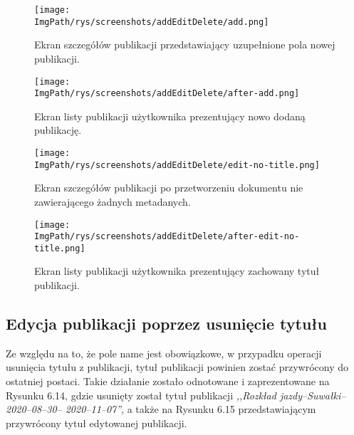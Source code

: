 \documentclass[a4paper,12pt,twoside,openany]{report}
\newcommand{\ImgPath}{.}
\begin{document}
\begin{figure}[!htbp]
	\begin{center}
		\centering
		\texttt{[image: \\ImgPath/rys/screenshots/addEditDelete/add.png]}
	\end{center}
	\caption{Ekran szczegółów publikacji przedstawiający uzupełnione pola nowej publikacji.}
	\label{zrzutSzczegolyPubPrzedDodaniem}
\end{figure}

\begin{figure}[!htbp]
	\begin{center}
		\centering
		\texttt{[image: \\ImgPath/rys/screenshots/addEditDelete/after-add.png]}
	\end{center}
	\caption{Ekran listy publikacji użytkownika prezentujący nowo dodaną publikację.}
	\label{zrzutListaPoDodaniu}
\end{figure}



\begin{figure}[!htbp]
	\begin{center}
		\centering
		\texttt{[image: \\ImgPath/rys/screenshots/addEditDelete/edit-no-title.png]}
	\end{center}
	\caption{Ekran szczegółów publikacji po przetworzeniu dokumentu nie zawierającego żadnych metadanych.}
	\label{zrzutPrzetwarzaniePusty}
\end{figure}

\begin{figure}[!htbp]
	\begin{center}
		\centering
		\texttt{[image: \\ImgPath/rys/screenshots/addEditDelete/after-edit-no-title.png]}
	\end{center}
	\caption{Ekran listy publikacji użytkownika prezentujący zachowany tytuł publikacji.}
	\label{zrzutNieUsunietyTytul}
\end{figure}

\subsection{Edycja publikacji poprzez usunięcie tytułu}
Ze względu na to, że pole name jest obowiązkowe, w przypadku operacji usunięcia tytułu z publikacji, tytuł publikacji powinien zostać przywrócony do ostatniej postaci. Takie działanie zostało odnotowane i zaprezentowane na Rysunku 6.14, gdzie usunięty został tytuł publikacji \textit{,,Rozkład jazdy--Suwałki--2020--08--30-- 2020--11--07''}, a także na Rysunku 6.15 przedstawiającym  przywrócony tytuł edytowanej publikacji.
\end{document}
